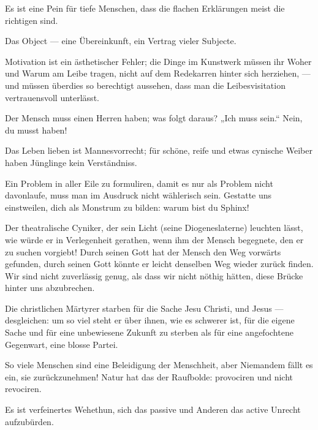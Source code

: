 Es ist eine Pein für tiefe Menschen, dass die flachen Erklärungen meist die richtigen sind.
\par

Das Object — eine Übereinkunft, ein Vertrag vieler Subjecte.
\par

Motivation ist ein ästhetischer Fehler; die Dinge im Kunstwerk müssen ihr Woher und Warum am Leibe tragen, nicht auf dem Redekarren hinter sich herziehen, — und müssen überdies so berechtigt aussehen, dass man die Leibesvisitation vertrauensvoll unterlässt.
\par

Der Mensch muss einen Herren haben; was folgt daraus? „Ich muss sein.“ Nein, du musst haben!
\par

Das Leben lieben ist Mannesvorrecht; für schöne, reife und etwas cynische Weiber haben Jünglinge kein Verständniss.
\par

Ein Problem in aller Eile zu formuliren, damit es nur als Problem nicht davonlaufe, muss man im Ausdruck nicht wählerisch sein. Gestatte uns einstweilen, dich als Monstrum zu bilden: warum bist du Sphinx!
\par

Der theatralische Cyniker, der sein Licht (seine Diogeneslaterne) leuchten lässt, wie würde er in Verlegenheit gerathen, wenn ihm der Mensch begegnete, den er zu suchen vorgiebt! Durch seinen Gott hat der Mensch den Weg vorwärts gefunden, durch seinen Gott könnte er leicht denselben Weg wieder zurück finden. Wir sind nicht zuverlässig genug, als dass wir nicht nöthig hätten, diese Brücke hinter uns abzubrechen.
\par

Die christlichen Märtyrer starben für die Sache Jesu Christi, und Jesus — desgleichen: um so viel steht er über ihnen, wie es schwerer ist, für die eigene Sache und für eine unbewiesene Zukunft zu sterben als für eine angefochtene Gegenwart, eine blosse Partei.
\par

So viele Menschen sind eine Beleidigung der Menschheit, aber Niemandem fällt es ein, sie zurückzunehmen! Natur hat das  der Raufbolde: provociren und nicht revociren.
\par

Es ist verfeinertes Wehethun, sich das passive und Anderen das active Unrecht aufzubürden.
\par

